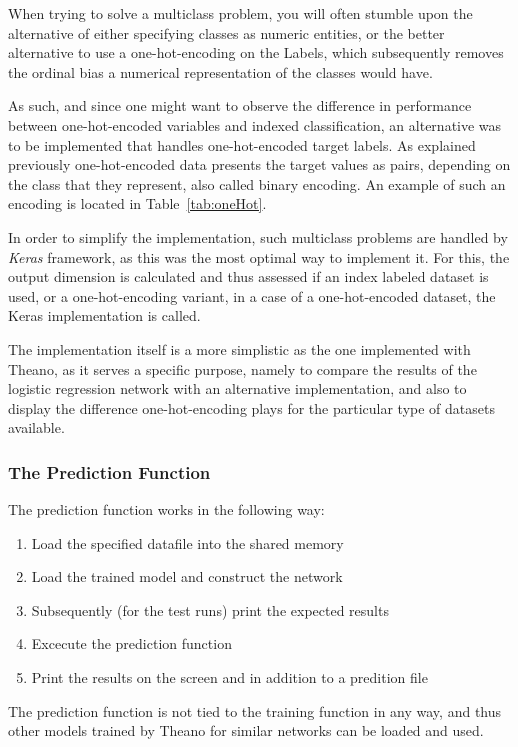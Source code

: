 \documentclass[12pt]{article}
\begin{document}
When trying to solve a multiclass problem, you will often stumble upon the alternative of either specifying classes as numeric entities, or the better alternative to use a one-hot-encoding on the Labels, which subsequently removes the ordinal bias a numerical representation of the classes would have. 

As such, and since one might want to observe the difference in performance between one-hot-encoded variables and indexed classification, an alternative was to be implemented that handles one-hot-encoded target labels. As explained previously one-hot-encoded data presents the target values as pairs, depending on the class that they represent, also called binary encoding. An example of such an encoding is located in Table~\ref{tab:oneHot}.

In order to simplify the implementation, such multiclass problems are handled by \emph{Keras} framework, as this was the most optimal way to implement it. For this, the output dimension is calculated and thus assessed if an index labeled dataset is used, or a one-hot-encoding variant, in a case of a one-hot-encoded dataset, the Keras implementation is called. 

The implementation itself is a more simplistic as the one implemented with Theano, as it serves a specific purpose, namely to compare the results of the logistic regression network with an alternative implementation, and also to display the difference one-hot-encoding plays for the particular type of datasets available.

\subsubsection{The Prediction Function}
\label{subsub:prediction}

The prediction function works in the following way:
\begin{enumerate}
    \item Load the specified datafile into the shared memory
    \item Load the trained model and construct the network
    \item Subsequently (for the test runs) print the expected results
    \item Excecute the prediction function
    \item Print the results on the screen and in addition to a predition file
\end{enumerate}

The prediction function is not tied to the training function in any way, and thus other models trained by Theano for similar networks can be loaded and used.
\end{document}
